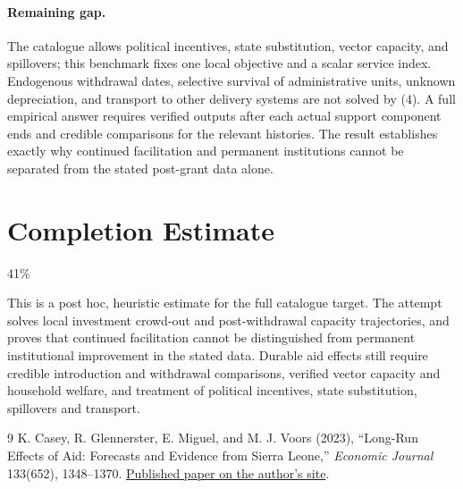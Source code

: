 \documentclass[11pt]{article}
\theoremstyle{definition}
\begin{document}
\paragraph{Remaining gap.}
The catalogue allows political incentives, state substitution, vector capacity, and spillovers; this benchmark fixes one local objective and a scalar service index. Endogenous withdrawal dates, selective survival of administrative units, unknown depreciation, and transport to other delivery systems are not solved by (4). A full empirical answer requires verified outputs after each actual support component ends and credible comparisons for the relevant histories. The result establishes exactly why continued facilitation and permanent institutions cannot be separated from the stated post-grant data alone.

\section{Completion Estimate}
41\%

This is a post hoc, heuristic estimate for the full catalogue target.
The attempt solves local investment crowd-out and post-withdrawal capacity trajectories, and proves that continued facilitation cannot be distinguished from permanent institutional improvement in the stated data. Durable aid effects still require credible introduction and withdrawal comparisons, verified vector capacity and household welfare, and treatment of political incentives, state substitution, spillovers and transport.

\begin{thebibliography}{9}
 K. Casey, R. Glennerster, E. Miguel, and M. J. Voors (2023), ``Long-Run Effects of Aid: Forecasts and Evidence from Sierra Leone,'' \emph{Economic Journal} 133(652), 1348--1370. \href{https://emiguel.econ.berkeley.edu/wordpress/wp-content/uploads/2023/09/uead001.pdf}{Published paper on the author's site}.
\end{thebibliography}
\end{document}
